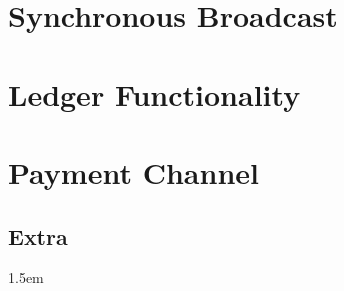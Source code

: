 \documentclass[11pt]{article}
\begin{document}
\section{Synchronous Broadcast}


\section{Ledger Functionality}


\section{Payment Channel}


%	

\begin{figure}
	
\end{figure}

\begin{figure}
	
\end{figure}

\begin{figure}
	
\end{figure}

\subsection{Extra}

\begin{figure}
	
\end{figure}

\begin{figure}
	
\end{figure}

\newpage

\begin{figure}
	
\end{figure}

\begin{figure}
	
\end{figure}




\emergencystretch 1.5em

\end{document}
